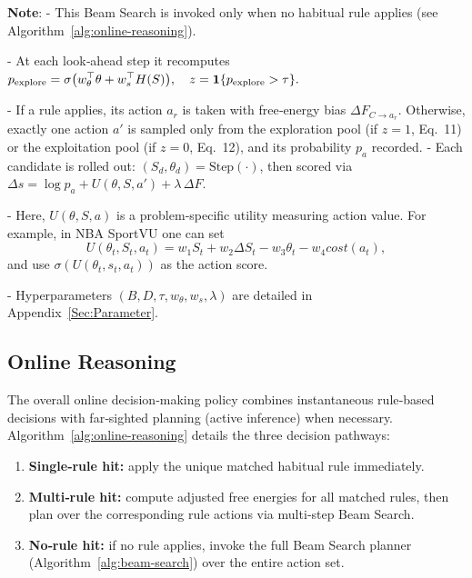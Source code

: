 \documentclass{article} %
\begin{document}
\noindent\textbf{Note}:  
- This Beam Search is invoked only when no habitual rule applies (see Algorithm~\ref{alg:online-reasoning}). 

- At each look‐ahead step it recomputes  
  \(\displaystyle p_{\rm explore}=\sigma\bigl(w_\theta^\top\theta + w_s^\top H(S)\bigr),\quad 
     z=\mathbf1\{p_{\rm explore}>\tau\}.\)  

- If a rule applies, its action $a_r$ is taken with free‐energy bias \(\Delta F_{C\to a_r}\). Otherwise, exactly one action $a'$ is sampled only from the exploration pool (if \(z=1\), Eq.~11) or the exploitation pool (if \(z=0\), Eq.~12), and its probability \(p_a\) recorded.  
- Each candidate is rolled out: \((S_d,\theta_d)=\mathrm{Step}(\cdot)\), then scored via  
  \(\Delta s = \log p_a + U(\theta,S,a') + \lambda\,\Delta F.\)
  
- Here, \(U(\theta,S,a)\) is a problem‐specific utility measuring action value. For example, in NBA SportVU one can set  
  \[
    U(\theta_t,S_t,a_t) = w_1 S_t + w_2 \Delta S_t - w_3 \theta_t - w_4 cost(a_t),
  \]
  and use \(\sigma(U(\theta_t,s_t,a_t))\) as the action score.
  
- Hyperparameters \((B,D,\tau,w_\theta,w_s,\lambda)\) are detailed in Appendix~\ref{Sec:Parameter}.


\subsection{Online Reasoning}
\label{Sec:Reasoning}
The overall online decision‐making policy combines instantaneous rule‐based decisions with far‐sighted planning (active inference) when necessary. Algorithm~\ref{alg:online-reasoning} details the three decision pathways:

\begin{enumerate}[label=(\arabic*)]
  \item \textbf{Single‐rule hit:} apply the unique matched habitual rule immediately.
  \item \textbf{Multi‐rule hit:} compute adjusted free energies for all matched rules, then plan over the corresponding rule actions via multi‐step Beam Search.
  \item \textbf{No‐rule hit:} if no rule applies, invoke the full Beam Search planner (Algorithm~\ref{alg:beam-search}) over the entire action set.
\end{enumerate}
\end{document}
